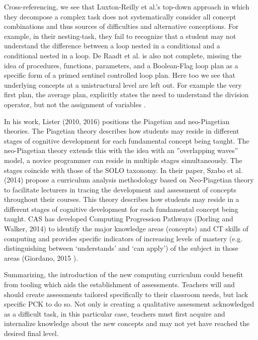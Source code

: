 Cross-referencing, we see that Luxton-Reilly et al.’s top-down approach in which they decompose a complex task does not systematically consider all concept combinations and thus sources of difficulties and alternative conceptions. For example, in their nesting-task, they fail to recognize that a student may not understand the difference between a loop nested in a conditional and a conditional nested in a loop. De Raadt et al. is also not complete, missing the idea of procedures, functions, parameters, and a Boolean-Flag loop plan as a specific form of a primed sentinel controlled loop plan. Here too we see that underlying concepts at a unistructural level are left out. For  example the very first plan, the average plan, explicitly states the need to understand the division operator, but not the assignment of variables .

In his work, Lister (2010, 2016) positions the Piagetian and neo-Piagetian theories. The Piagetian theory describes how students may reside in different stages of cognitive development for each fundamental concept being taught. The neo-Piagetian theory extends this with the idea with an ”overlapping waves” model, a novice programmer can reside in multiple stages simultaneously. The stages coincide with those of the SOLO taxonomy. In their paper, Szabo et al. (2014) propose a curriculum analysis methodology based on Neo-Piagetian theory to facilitate lecturers in tracing the development and assessment of concepts throughout their courses. This theory describes how students may reside in a different stages of cognitive development for each fundamental concept being taught. CAS has developed Computing Progression Pathways (Dorling and Walker, 2014) to identify the major knowledge areas (concepts) and CT skills of computing and provides specific indicators of increasing levels of mastery (e.g. distinguishing between ‘understands’ and ‘can apply’) of the subject in those areas (Giordano, 2015  ). 

Summarizing, the introduction of the new computing curriculum could benefit from tooling which aids the establishment of assessments. Teachers will and should create assessments tailored specifically to their classroom needs, but lack specific PCK to do so. Not only is creating a qualitative assessment acknowledged as a difficult task, in this particular case, teachers must first acquire and internalize knowledge about the new concepts and may not yet have reached the desired final level.





